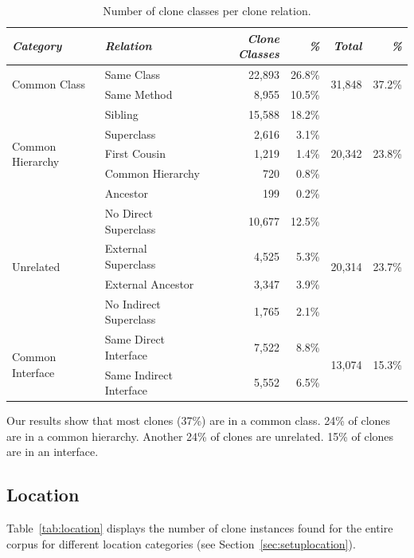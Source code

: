 \documentclass[runningheads]{llncs}
\begin{document}
\begin{table}[H]
\centering
\begin{tabular}{@{}l|l|rr|rr@{}}
\toprule
\textit{\textbf{Category}} & \textit{\textbf{Relation}} & \textit{\textbf{Clone Classes}} & \textit{\textbf{\%}} & \textit{\textbf{Total}} & \textit{\textbf{\%}} \\ \midrule
\multirow{2}{*}{Common Class} & Same Class & 22,893 & 26.8\% & \multirow{2}{*}{31,848} & \multirow{2}{*}{37.2\%} \\ \cmidrule(lr){2-4}
 & Same Method & 8,955 & 10.5\% & & \\ \midrule
\multirow{5}{*}{Common Hierarchy} & Sibling & 15,588 & 18.2\% & \multirow{5}{*}{20,342}& \multirow{5}{*}{23.8\%} \\ \cmidrule(lr){2-4}
 & Superclass & 2,616 & 3.1\% & & \\ \cmidrule(lr){2-4}
 & First Cousin & 1,219 & 1.4\% & & \\ \cmidrule(lr){2-4}
 & Common Hierarchy & 720 & 0.8\% & & \\ \cmidrule(lr){2-4}
 & Ancestor & 199 & 0.2\% & & \\ \midrule
\multirow{4}{*}{Unrelated} & No Direct Superclass & 10,677 & 12.5\% & \multirow{4}{*}{20,314}& \multirow{4}{*}{23.7\%} \\ \cmidrule(lr){2-4}
 & External Superclass & 4,525 & 5.3\% & & \\ \cmidrule(lr){2-4}
 & External Ancestor & 3,347 & 3.9\% & & \\ \cmidrule(lr){2-4}
 & No Indirect Superclass & 1,765 & 2.1\% & & \\ \midrule
\multirow{2}{*}{Common Interface} & Same Direct Interface & 7,522 & 8.8\% & \multirow{2}{*}{13,074} & \multirow{2}{*}{15.3\%} \\ \cmidrule(lr){2-4}
 & Same Indirect Interface & 5,552 & 6.5\% & & \\ \bottomrule
\end{tabular}
\caption{Number of clone classes per clone relation.}
\label{tab:relation}
\end{table}

Our results show that most clones (37\%) are in a common class. 24\% of clones are in a common hierarchy. Another 24\% of clones are unrelated. 15\% of clones are in an interface.

\subsection{Location}
Table~\ref{tab:location} displays the number of clone instances found for the entire corpus for different location categories (see Section~\ref{sec:setuplocation}).
\end{document}

